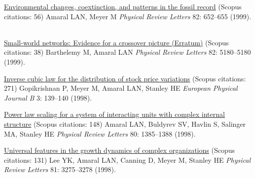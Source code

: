 \NumberedItem{\makebox[0.8cm][r]{[23]}}
\href{/people/amaral/environmental-changes-coextinction-and-patterns-in-the-fossil-record}
{Environmental changes, coextinction, and patterns in the fossil record}
    (Scopus citations: 56)
\newline
Amaral LAN, Meyer M
\newline
\textit{Physical Review Letters}
    82:
652--655 (1999).
\newline
\Gap
~
\Gap

\NumberedItem{\makebox[0.8cm][r]{[22]}}
\href{/people/amaral/small-world-networks-evidence-for-a-crossover-picture-vol-82-pg-3180-1999}
{Small-world networks: Evidence for a crossover picture (Erratum)}
    (Scopus citations: 38)
\newline
Barthelemy M, Amaral LAN
\newline
\textit{Physical Review Letters}
    82:
5180--5180 (1999).
\newline
\Gap
~
\Gap

\NumberedItem{\makebox[0.8cm][r]{[21]}}
\href{/people/amaral/inverse-cubic-law-for-the-distribution-of-stock-price-variations}
{Inverse cubic law for the distribution of stock price variations}
    (Scopus citations: 271)
\newline
Gopikrishnan P, Meyer M, Amaral LAN, Stanley HE
\newline
\textit{European Physical Journal B}
    3:
139--140 (1998).
\newline
\Gap
~
\Gap

\NumberedItem{\makebox[0.8cm][r]{[20]}}
\href{/people/amaral/power-law-scaling-for-a-system-of-interacting-units-with-complex-internal-structure}
{Power law scaling for a system of interacting units with complex internal structure}
    (Scopus citations: 148)
\newline
Amaral LAN, Buldyrev SV, Havlin S, Salinger MA, Stanley HE
\newline
\textit{Physical Review Letters}
    80:
1385--1388 (1998).
\newline
\Gap
~
\Gap

\NumberedItem{\makebox[0.8cm][r]{[19]}}
\href{/people/amaral/universal-features-in-the-growth-dynamics-of-complex-organizations}
{Universal features in the growth dynamics of complex organizations}
    (Scopus citations: 131)
\newline
Lee YK, Amaral LAN, Canning D, Meyer M, Stanley HE
\newline
\textit{Physical Review Letters}
    81:
3275--3278 (1998).
\newline
\Gap
~
\Gap


